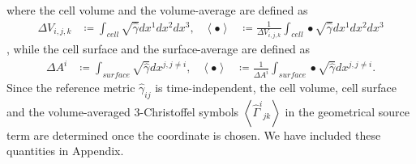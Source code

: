where the cell volume and the volume-average are defined as
\begin{align}
    \Delta V_{i,j,k} &\coloneqq \int_{cell} \sqrt{\hat{\gamma}} dx^1 dx^2 dx^3, &
    \left\langle \bullet \right\rangle &\coloneqq \frac{1}{\Delta V_{i,j,k}} \int_{cell} \bullet \sqrt{\hat{\gamma}} dx^1 dx^2 dx^3
\end{align},
while the cell surface and the surface-average are defined as
\begin{align}
    \Delta A^i &\coloneqq \int_{surface} \sqrt{\hat{\gamma}} dx^{j,j\neq i}, &
    \left\langle \bullet \right\rangle &\coloneqq \frac{1}{\Delta A^i} \int_{surface} \bullet \sqrt{\hat{\gamma}} dx^{j,j\neq i}.
\end{align}
Since the reference metric $\hat{\gamma}_{ij}$ is time-independent,
the cell volume, cell surface and the volume-averaged 3-Christoffel symbols
$\left\langle \hat{\Gamma}^i{}_{jk} \right\rangle$ in the geometrical source term
are determined once the coordinate is chosen.
We have included these quantities in Appendix.

